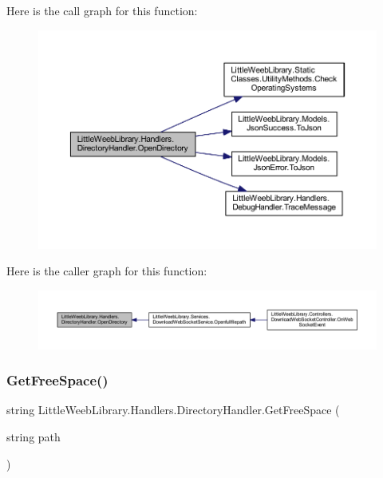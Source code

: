 Here is the call graph for this function\+:\nopagebreak
\begin{figure}[H]
\begin{center}
\leavevmode
\includegraphics[width=350pt]{class_little_weeb_library_1_1_handlers_1_1_directory_handler_a4f3f5841ead561873cc5130efc6294aa_cgraph}
\end{center}
\end{figure}
Here is the caller graph for this function\+:\nopagebreak
\begin{figure}[H]
\begin{center}
\leavevmode
\includegraphics[width=350pt]{class_little_weeb_library_1_1_handlers_1_1_directory_handler_a4f3f5841ead561873cc5130efc6294aa_icgraph}
\end{center}
\end{figure}
\mbox{\label{class_little_weeb_library_1_1_handlers_1_1_directory_handler_aa439a303572de6bf09438d38a7fa4698}} 
\subsubsection{\texorpdfstring{Get\+Free\+Space()}{GetFreeSpace()}}
{\footnotesize\ttfamily string Little\+Weeb\+Library.\+Handlers.\+Directory\+Handler.\+Get\+Free\+Space (\begin{DoxyParamCaption}\item[{string}]{path }\end{DoxyParamCaption})}



